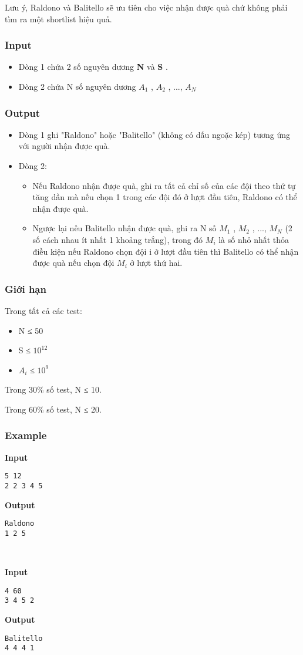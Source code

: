 Lưu ý, Raldono và Balitello sẽ ưu tiên cho việc nhận được quà chứ không phải tìm ra một shortlist hiệu quả.

\subsubsection{Input}
\begin{itemize}
	\item Dòng 1 chứa 2 số nguyên dương \textbf{ N } và \textbf{ S } .
	\item Dòng 2 chứa N số nguyên dương \textbf{ $A_{1}$} , \textbf{ $A_{2}$} , ..., \textbf{ $A_{N}$}
\end{itemize}

\subsubsection{Output}
\begin{itemize}
	\item Dòng 1 ghi "Raldono" hoặc "Balitello" (không có dấu ngoặc kép) tương ứng với người nhận được quà.
	\item Dòng 2:
\begin{itemize}
	\item Nếu Raldono nhận được quà, ghi ra tất cả chỉ số của các đội theo thứ tự tăng dần mà nếu chọn 1 trong các đội đó ở lượt đầu tiên, Raldono có thể nhận được quà.
	\item Ngược lại nếu Balitello nhận được quà, ghi ra N số $M_{1}$ , $M_{2}$ , ..., $M_{N}$ (2 số cách nhau ít nhất 1 khoảng trắng), trong đó $M_{i}$ là số nhỏ nhất thỏa điều kiện nếu Raldono chọn đội i ở lượt đầu tiên thì Balitello có thể nhận được quà nếu chọn đội $M_{i}$ ở lượt thứ hai.
\end{itemize}
\end{itemize}

\subsubsection{Giới hạn}

Trong tất cả các test:
\begin{itemize}
	\item N ≤ 50
	\item S ≤ $10^{12}$
	\item $A_{i}$ ≤ $10^{9}$
\end{itemize}

Trong 30\% số test, N ≤ 10.

Trong 60\% số test, N ≤ 20.

\subsubsection{Example}

\textbf{Input }
\begin{verbatim}
5 12
2 2 3 4 5\end{verbatim}

\textbf{Output }
\begin{verbatim}
Raldono
1 2 5\end{verbatim}

 

\textbf{Input }
\begin{verbatim}
4 60
3 4 5 2\end{verbatim}

\textbf{Output }
\begin{verbatim}
Balitello
4 4 4 1\end{verbatim}
